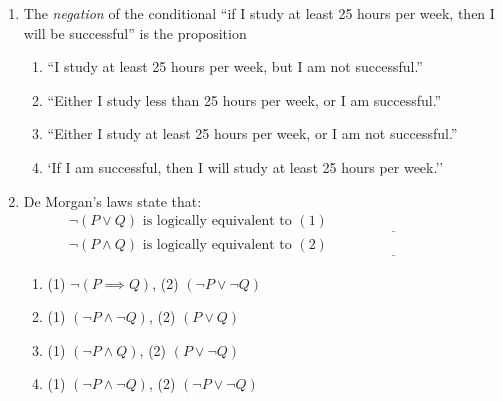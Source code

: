 \begin{enumerate}
  \item The \emph{negation} of the conditional ``if I study at least 25 hours per week, then I will be successful'' is the proposition \underline{\phantom{$\not Q\implies\not P$}\qquad\qquad}
  \begin{enumerate}
      \item ``I study at least 25 hours per week, but I am not successful.''
      \item ``Either I study less than 25 hours per week, or I am successful.''
      \item ``Either I study at least 25 hours per week, or I am not successful.''
      \item `If I am successful, then I will study at least 25 hours per week.''
  \end{enumerate}
  
  \item De Morgan's laws state that:
  \begin{gather*}
    \neg(P\vee Q) \text{ is logically equivalent to } (1) \underline{\phantom{(\neg P)\wedge (\neg Q)}\qquad}\\
    \neg(P\wedge Q) \text{ is logically equivalent to } (2) \underline{\phantom{(\neg P)\vee (\neg Q)\qquad}}
  \end{gather*}
  \begin{enumerate}
      \item (1) $\neg (P \implies Q)$, \quad (2) $(\neg P \lor \neg Q)$
      \item (1) $(\neg P \land \neg Q)$, \quad (2) $(P \lor Q)$
      \item (1) $(\neg P \land Q)$, \quad (2) $(P \lor \neg Q)$
      \item (1) $(\neg P \land \neg Q)$, \quad (2) $(\neg P \lor \neg Q)$
  \end{enumerate}
\end{enumerate}



